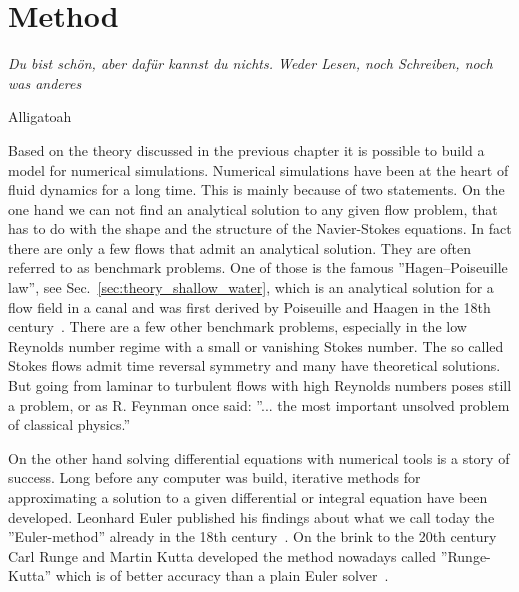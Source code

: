 \chapter{Method}
\label{chapter:method}
\epigraph{\textit{Du bist schön, aber dafür kannst du nichts.
Weder Lesen, noch Schreiben, noch was anderes}}{Alligatoah}
Based on the theory discussed in the previous chapter it is possible to build a model for numerical simulations.
Numerical simulations have been at the heart of fluid dynamics for a long time.
This is mainly because of two statements.
On the one hand we can not find an analytical solution to any given flow problem, that has to do with the shape and the structure of the Navier-Stokes equations.
In fact there are only a few flows that admit an analytical solution. 
They are often referred to as benchmark problems.
One of those is the famous ''Hagen–Poiseuille law'', see  Sec.~\ref{sec:theory_shallow_water}, which is an analytical solution for a flow field in a canal and was first derived by Poiseuille and Haagen in the 18th century~\cite{sutera1993history}.
There are a few other benchmark problems, especially in the low Reynolds number regime with a small or vanishing Stokes number.
The so called Stokes flows admit time reversal symmetry and many have theoretical solutions.
But going from laminar to turbulent flows with high Reynolds numbers poses still a problem, or as R. Feynman once said: ''... the most important unsolved problem of classical physics.''

On the other hand solving differential equations with numerical tools is a story of success.
Long before any computer was build, iterative methods for approximating a solution to a given differential or integral equation have been developed.
Leonhard Euler published his findings about what we call today the ''Euler-method'' already in the 18th century~\cite{brezinski2012numerical}.
On the brink to the 20th century Carl Runge and Martin Kutta developed the method nowadays called ''Runge-Kutta'' which is of better accuracy than a plain Euler solver~\cite{kutta1901beitrag, runge1895numerische}.


